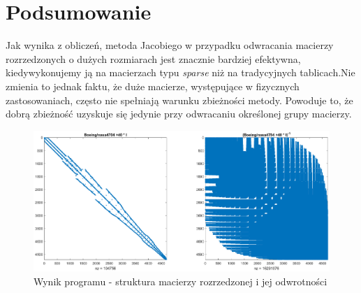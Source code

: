 \documentclass[a4paper,margin=1.54cm]{article}
\begin{document}
\section{Podsumowanie}
Jak wynika z obliczeń, metoda Jacobiego w przypadku odwracania macierzy rozrzedzonych o dużych rozmiarach jest znacznie bardziej efektywna, kiedy\linebreak wykonujemy ją na macierzach typu \textit{sparse} niż na tradycyjnych tablicach.\linebreak Nie zmienia to jednak faktu, że duże macierze, występujące w fizycznych zastosowaniach, często nie spełniają warunku zbieżności metody. Powoduje to, że dobrą zbieżność uzyskuje się jedynie przy odwracaniu określonej grupy macierzy. 

\begin{figure}[!ht]
\centering
\includegraphics[width=\textwidth]{matrixandinversed.eps}
\caption{Wynik programu - struktura macierzy rozrzedzonej i jej odwrotności}
\label{fig:universe}
\end{figure}



\end{document}
